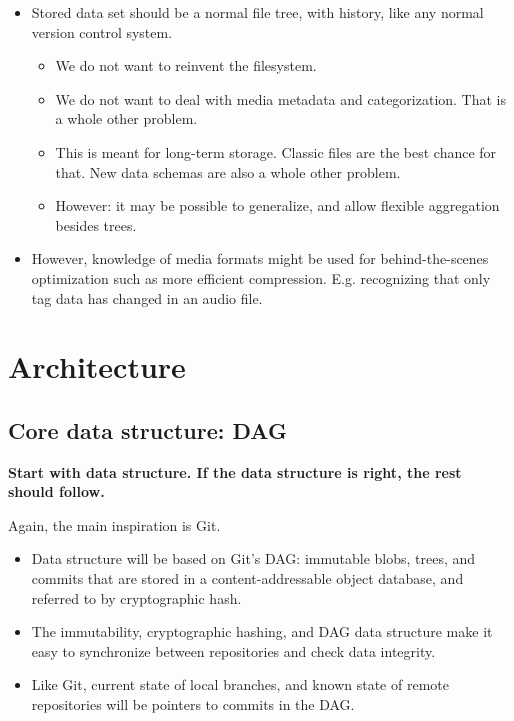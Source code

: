 \documentclass[a4paper]{article}
\begin{document}
\begin{itemize}
\item
  Stored data set should be a normal file tree, with history, like any
  normal version control system.

  \begin{itemize}
  \item
    We do not want to reinvent the filesystem.
  \item
    We do not want to deal with media metadata and categorization. That
    is a whole other problem.
  \item
    This is meant for long-term storage. Classic files are the best
    chance for that. New data schemas are also a whole other problem.
  \item
    However: it may be possible to generalize, and allow flexible
    aggregation besides trees.
  \end{itemize}
\item
  However, knowledge of media formats might be used for
  behind-the-scenes optimization such as more efficient compression.
  E.g. recognizing that only tag data has changed in an audio file.
\end{itemize}

\section{Architecture}\label{architecture}

\subsection{Core data structure: DAG}\label{core-data-structure-dag}

\textbf{Start with data structure. If the data structure is right, the
rest should follow.}

Again, the main inspiration is Git.

\begin{itemize}
\item
  Data structure will be based on Git's DAG: immutable blobs, trees, and commits
  that are stored in a content-addressable object database, and referred to by
  cryptographic hash.
\item
  The immutability, cryptographic hashing, and DAG data structure make it easy
  to synchronize between repositories and check data integrity.
\item
  Like Git, current state of local branches, and known state of remote
  repositories will be pointers to commits in the DAG.
\end{itemize}
\end{document}
